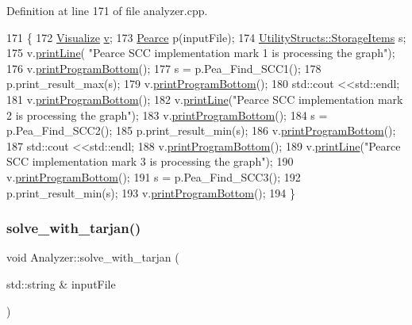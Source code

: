 Definition at line 171 of file analyzer.\+cpp.


\begin{DoxyCode}
171                                                     \{
172     \hyperlink{class_visualize}{Visualize} \hyperlink{class_analyzer_ae32079d0816589617a0c76b1d4cf881b}{v};
173     \hyperlink{class_pearce}{Pearce} p(inputFile);
174     \hyperlink{struct_utility_structs_1_1_storage_items}{UtilityStructs::StorageItems} s;
175     v.\hyperlink{class_visualize_abce6cd538dc0715b21851e0bf0377d85}{printLine}( \textcolor{stringliteral}{"Pearce SCC implementation mark 1 is processing the graph"});
176     v.\hyperlink{class_visualize_ac0be9ece2d80a7d1e34724fb87424216}{printProgramBottom}();
177     s = p.Pea\_Find\_SCC1();
178     p.print\_result\_max(s);
179     v.\hyperlink{class_visualize_ac0be9ece2d80a7d1e34724fb87424216}{printProgramBottom}();
180     std::cout <<std::endl;
181     v.\hyperlink{class_visualize_ac0be9ece2d80a7d1e34724fb87424216}{printProgramBottom}();
182     v.\hyperlink{class_visualize_abce6cd538dc0715b21851e0bf0377d85}{printLine}(\textcolor{stringliteral}{"Pearce SCC implementation mark 2 is processing the graph"});
183     v.\hyperlink{class_visualize_ac0be9ece2d80a7d1e34724fb87424216}{printProgramBottom}();
184     s = p.Pea\_Find\_SCC2();
185     p.print\_result\_min(s);
186     v.\hyperlink{class_visualize_ac0be9ece2d80a7d1e34724fb87424216}{printProgramBottom}();
187     std::cout <<std::endl;
188     v.\hyperlink{class_visualize_ac0be9ece2d80a7d1e34724fb87424216}{printProgramBottom}();
189     v.\hyperlink{class_visualize_abce6cd538dc0715b21851e0bf0377d85}{printLine}(\textcolor{stringliteral}{"Pearce SCC implementation mark 3 is processing the graph"});
190     v.\hyperlink{class_visualize_ac0be9ece2d80a7d1e34724fb87424216}{printProgramBottom}();
191     s = p.Pea\_Find\_SCC3();
192     p.print\_result\_min(s);
193     v.\hyperlink{class_visualize_ac0be9ece2d80a7d1e34724fb87424216}{printProgramBottom}();
194 \}
\end{DoxyCode}
\mbox{\label{class_analyzer_a8207cd71986d26dc8abda1a807490ab2}} 
\subsubsection{\texorpdfstring{solve\+\_\+with\+\_\+tarjan()}{solve\_with\_tarjan()}}
{\footnotesize\ttfamily void Analyzer\+::solve\+\_\+with\+\_\+tarjan (\begin{DoxyParamCaption}\item[{std\+::string \&}]{input\+File }\end{DoxyParamCaption})}



